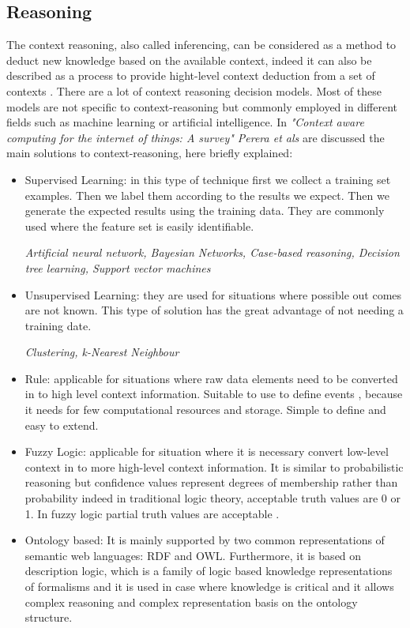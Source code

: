 \documentclass{thesisreport}
\begin{document}
 \subsection{Reasoning}
 The context reasoning, also called inferencing, can be considered as a method to deduct new knowledge based on the available context, indeed it can also be described as a process to provide hight-level context deduction from a set of contexts \cite{perera2014context}.
 There are a lot of context reasoning decision models. Most of these models are not specific to context-reasoning but commonly employed in different fields such as machine learning or artificial intelligence.
 In \textit{"Context aware computing for the internet of things: A survey" Perera et als} \cite{perera2014context} are discussed the main solutions to context-reasoning, here briefly explained: 
 \begin{itemize}
     \item Supervised Learning: in this type of technique first we collect a training set examples. Then we label them according to the results we expect. Then we generate the expected results using the training data.
     They are commonly used where the feature set is easily identifiable.
     
     \textit{Artificial neural network, Bayesian Networks, Case-based reasoning, Decision tree learning, Support vector machines}
     \item Unsupervised Learning: they are used for situations where possible out comes are not known. This type of solution has the great advantage of not needing a training date.
     
     \textit{Clustering, k-Nearest Neighbour}
     \item Rule: applicable for situations where raw data elements need to be converted in to high level context information. Suitable to use to define events , because it needs for few computational resources and storage. Simple to define and easy to extend. 
     \item Fuzzy Logic: applicable for situation where it is necessary convert low-level context in to more high-level context information. It is similar to probabilistic reasoning but confidence values represent degrees of membership rather than probability indeed in traditional logic theory, acceptable truth values are 0 or 1. In fuzzy logic partial truth values are acceptable \cite{perera2014context}. 
     \item Ontology based: It is mainly supported by two common representations of semantic web languages: RDF and OWL. Furthermore, it is based on description logic, which is a family of logic based knowledge representations of formalisms and it is used in case where knowledge is critical and it allows complex reasoning and complex representation basis on the ontology structure.
    

\end{itemize}
\end{document}
